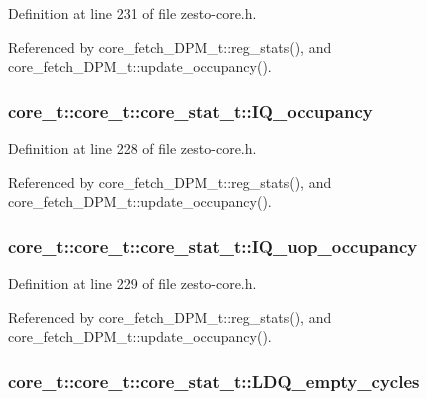 Definition at line 231 of file zesto-core.h.

Referenced by core\_\-fetch\_\-DPM\_\-t::reg\_\-stats(), and core\_\-fetch\_\-DPM\_\-t::update\_\-occupancy().
\subsubsection[{IQ\_\-occupancy}]{ core\_\-t::core\_\-t::core\_\-stat\_\-t::IQ\_\-occupancy}\label{structcore__t_1_1core__stat__t_c8bae7936586e090215521daea934c48}




Definition at line 228 of file zesto-core.h.

Referenced by core\_\-fetch\_\-DPM\_\-t::reg\_\-stats(), and core\_\-fetch\_\-DPM\_\-t::update\_\-occupancy().
\subsubsection[{IQ\_\-uop\_\-occupancy}]{ core\_\-t::core\_\-t::core\_\-stat\_\-t::IQ\_\-uop\_\-occupancy}\label{structcore__t_1_1core__stat__t_27b35f79da6b58002c469bb911ad4551}




Definition at line 229 of file zesto-core.h.

Referenced by core\_\-fetch\_\-DPM\_\-t::reg\_\-stats(), and core\_\-fetch\_\-DPM\_\-t::update\_\-occupancy().
\subsubsection[{LDQ\_\-empty\_\-cycles}]{ core\_\-t::core\_\-t::core\_\-stat\_\-t::LDQ\_\-empty\_\-cycles}\label{structcore__t_1_1core__stat__t_4371248c98020ddd54dcf55af58c2711}




